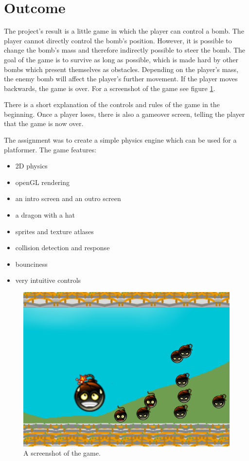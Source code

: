 \documentclass[12pt]{article}
\begin{document}
\section{Outcome}
\label{section:outcome}

The project's result is a little game in which the player can control a bomb. The player cannot directly control the bomb's position. However, it is possible to change the bomb's mass and therefore indirectly possible to steer the bomb. The goal of the game is to survive as long as possible, which is made hard by other bombs which present themselves as obstacles. Depending on the player's mass, the enemy bomb will affect the player's further movement. If the player moves backwards, the game is over. For a screenshot of the game see figure \ref{figure:outcome}.

There is a short explanation of the controls and rules of the game in the beginning. Once a player loses, there is also a gameover screen, telling the player that the game is now over.

The assignment was to create a simple physics engine which can be used for a platformer. The game features:

\begin{itemize}
	\item{2D physics}
	\item{openGL rendering}
	\item{an intro screen and an outro screen}
	\item{a dragon with a hat}
	\item{sprites and texture atlases}
	\item{collision detection and response}
	\item{bounciness}
	\item{very intuitive controls}
\end{itemize}

\begin{figure}[H]
	\includegraphics[width=\textwidth]{outcome.png}
	\caption{A screenshot of the game.}
	\label{figure:outcome}
\end{figure}
\end{document}
